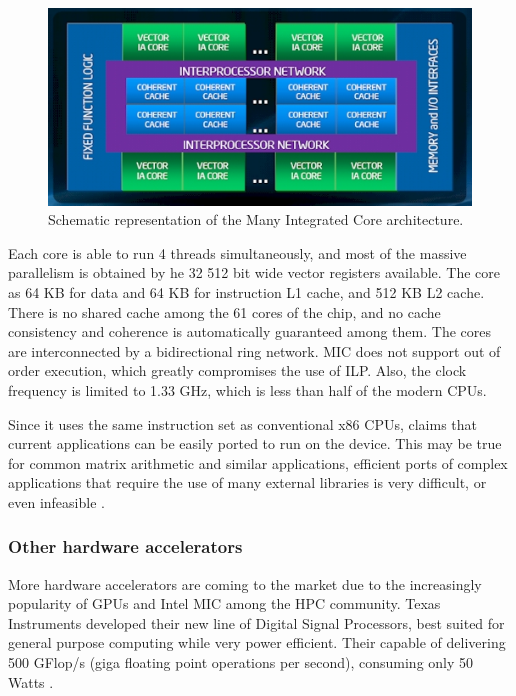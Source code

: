 \begin{figure}[!htp]
	\begin{center}
		\includegraphics[scale=0.65]{imgs/mic.png}
		\caption{Schematic representation of the \intel Many Integrated Core architecture.}
		\label{fig:mic}
	\end{center}
\end{figure}

Each core is able to run 4 threads simultaneously, and most of the massive parallelism is obtained by he 32 512 bit wide vector registers available. The core as 64 KB for data and 64 KB for instruction L1 cache, and 512 KB L2 cache. There is no shared cache among the 61 cores of the chip, and no cache consistency and coherence is automatically guaranteed among them. The cores are interconnected by a bidirectional ring network. MIC does not support out of order execution, which greatly compromises the use of ILP. Also, the clock frequency is limited to 1.33 GHz, which is less than half of the modern CPUs.

Since it uses the same instruction set as conventional x86 CPUs, \intel claims that current applications can be easily ported to run on the device. This may be true for common matrix arithmetic and similar applications, efficient ports of complex applications that require the use of many external libraries is very difficult, or even infeasible \cite{Msc:AMP}.

\subsubsection*{Other hardware accelerators}
\label{other_accelerators}

More hardware accelerators are coming to the market due to the increasingly popularity of GPUs and Intel MIC among the HPC community. Texas Instruments developed their new line of Digital Signal Processors, best suited for general purpose computing while very power efficient. Their capable of delivering 500 GFlop/s (giga floating point operations per second), consuming only 50 Watts \cite{Texas:DSP}.

